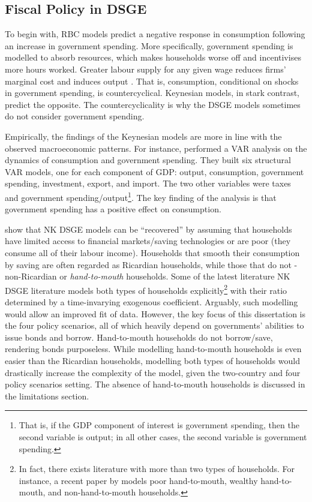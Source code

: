 \subsection{Fiscal Policy in DSGE}

To begin with, RBC models predict a negative response in consumption following an increase in government spending. More specifically, government spending is modelled to absorb resources, which makes households worse off and incentivises more hours worked. Greater labour supply for any given wage reduces firms' marginal cost and induces output \parencite[319]{baxter_1993_fiscal}. That is, consumption, conditional on shocks in government spending, is countercyclical. Keynesian models, in stark contrast, predict the opposite. The countercyclicality is why the DSGE models sometimes do not consider government spending. 

Empirically, the findings of the Keynesian models are more in line with the observed macroeconomic patterns. For instance, \textcite{blanchard_2002_an} performed a VAR analysis on the dynamics of consumption and government spending. They built six structural VAR models, one for each component of GDP: output, consumption, government spending, investment, export, and import. The two other variables were taxes and government spending/output\footnote{That is, if the GDP component of interest is government spending, then the second variable is output; in all other cases, the second variable is government spending.}. The key finding of the analysis is that government spending has a positive effect on consumption. 

\textcite{jordigal_2005_understanding} show that NK DSGE models can be ``recovered'' by assuming that households have limited access to financial markets/saving technologies or are poor (they consume all of their labour income). Households that smooth their consumption by saving are often regarded as Ricardian households, while those that do not - non-Ricardian or \textit{hand-to-mouth} households. Some of the latest literature NK DSGE literature models both types of households explicitly\footnote{In fact, there exists literature with more than two types of households. For instance, a recent paper by \textcite{eskelinen_2021_monetary} models poor hand-to-mouth, wealthy hand-to-mouth, and non-hand-to-mouth households.} with their ratio determined by a time-invarying exogenous coefficient. Arguably, such modelling would allow an improved fit of data. However, the key focus of this dissertation is the four policy scenarios, all of which heavily depend on governments' abilities to issue bonds and borrow. Hand-to-mouth households do not borrow/save, rendering bonds purposeless. While modelling hand-to-mouth households is even easier than the Ricardian households, modelling both types of households would drastically increase the complexity of the model, given the two-country and four policy scenarios setting. The absence of hand-to-mouth households is discussed in the limitations section.